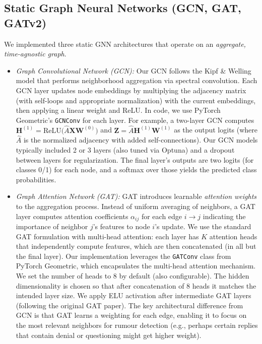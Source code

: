 \documentclass{cshonours}
\begin{document}
\subsection{Static Graph Neural Networks (GCN, GAT, GATv2)}

We implemented three static GNN architectures that operate on an \emph{aggregate, time-agnostic graph}.

\begin{itemize}
\item \emph{Graph Convolutional Network (GCN):} Our GCN follows the Kipf \& Welling model that performs neighborhood aggregation via spectral convolution. Each GCN layer updates node embeddings by multiplying the adjacency matrix (with self-loops and appropriate normalization) with the current embeddings, then applying a linear weight and ReLU. In code, we use PyTorch Geometric's \texttt{GCNConv} for each layer. For example, a two-layer GCN computes $\mathbf{H}^{(1)} = \text{ReLU}\!\big(\hat{A}\mathbf{X}\mathbf{W}^{(0)}\big)$ and $\mathbf{Z}=\hat{A}\mathbf{H}^{(1)}\mathbf{W}^{(1)}$ as the output logits (where $\hat{A}$ is the normalized adjacency with added self-connections). Our GCN models typically included 2 or 3 layers (also tuned via Optuna) and a dropout between layers for regularization. The final layer's outputs are two logits (for classes 0/1) for each node, and a softmax over those yields the predicted class probabilities.

\item \emph{Graph Attention Network (GAT):} GAT introduces learnable \emph{attention weights} to the aggregation process. Instead of uniform averaging of neighbors, a GAT layer computes attention coefficients $\alpha_{ij}$ for each edge $i\to j$ indicating the importance of neighbor $j$'s features to node $i$'s update. We use the standard GAT formulation with multi-head attention: each layer has $K$ attention heads that independently compute features, which are then concatenated (in all but the final layer). Our implementation leverages the \texttt{GATConv} class from PyTorch Geometric, which encapsulates the multi-head attention mechanism. We set the number of heads to 8 by default (also configurable). The hidden dimensionality is chosen so that after concatenation of 8 heads it matches the intended layer size. We apply ELU activation after intermediate GAT layers (following the original GAT paper). The key architectural difference from GCN is that GAT learns a weighting for each edge, enabling it to focus on the most relevant neighbors for rumour detection (e.g., perhaps certain replies that contain denial or questioning might get higher weight).


\end{itemize}
\end{document}

